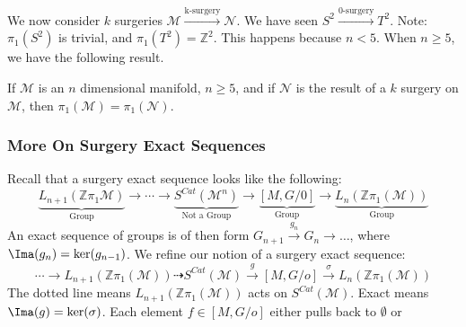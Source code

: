 \documentclass[crop=false,class=book,oneside]{standalone}                      %
\begin{document}
            We now consider $k$ surgeries
            $\mathcal{M}\overset{\textrm{k-surgery}}%
                                {\longrightarrow}\mathcal{N}$.
            We have seen
            $S^{2}\overset{\textrm{0-surgery}}{\longrightarrow}T^{2}$.
            Note: $\pi_{1}(S^{2})$ is trivial, and
            $\pi_{1}(T^{2})=\mathbb{Z}^{2}$. This happens because $n<5$. When
            $n\geq{5}$, we have the following result.
            \begin{theorem}
                If $\mathcal{M}$ is an $n$ dimensional manifold, $n\geq{5}$,
                and if $\mathcal{N}$ is the result of a $k$ surgery on
                $\mathcal{M}$, then $\pi_{1}(\mathcal{M})=\pi_{1}(\mathcal{N})$.
            \end{theorem}
        \subsubsection{More On Surgery Exact Sequences}
            Recall that a surgery exact sequence looks like the following:
            \begin{equation*}
                \underset{\textrm{Group}}
                {\underbrace{L_{n+1}(\mathbb{Z}\pi_{1}\mathcal{M})}}
                \rightarrow\cdots\rightarrow
                \underset{\textrm{Not a Group}}
                {\underbrace{S^{Cat}(\mathcal{M}^{n})}}
                \rightarrow
                \underset{\textrm{Group}}
                {\underbrace{[M,G/0]}}
                \rightarrow \underset{\textrm{Group}}
                {\underbrace{L_{n}(\mathbb{Z}\pi_{1}(\mathcal{M}))}} 
            \end{equation*}
            An exact sequence of groups is of then form
            $G_{n+1}\overset{g_{n}}{\rightarrow}%
             G_{n}\rightarrow \hdots$,
            where $\Ima(g_n)=\ker(g_{n-1})$. We refine our notion of a
            surgery exact sequence:
            \begin{equation*}
                \cdots\rightarrow
                L_{n+1}(\mathbb{Z}\pi_{1}(\mathcal{M}))
                \dashrightarrow{S^{Cat}}(\mathcal{M})
                \overset{g}{\rightarrow}[M,G/o]
                \overset{\sigma}{\rightarrow}
                L_{n}(\mathbb{Z}\pi_{1}(\mathcal{M}))
            \end{equation*}
            The dotted line means
            $L_{n+1}(\mathbb{Z}\pi_{1}(\mathcal{M}))$
            acts on $S^{Cat}(\mathcal{M})$. Exact means $\Ima(g)=\ker(\sigma)$.
            Each element $f\in{[M,G/o]}$ either pulls back to $\emptyset$ or
\end{document}
